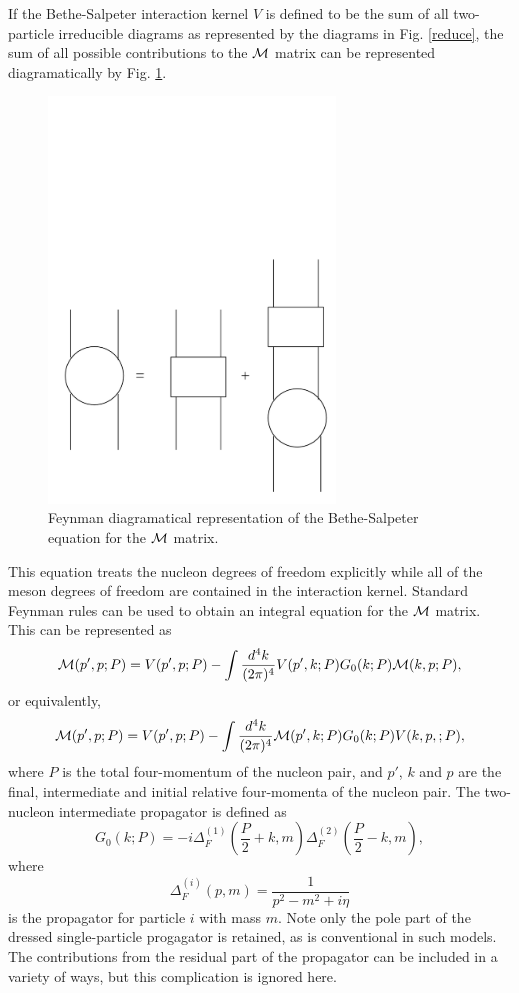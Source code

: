 \documentclass[mythesis.tex]{subfiles}
\begin{document}
If the Bethe-Salpeter interaction kernel $V$ is defined to be the sum of
all two-particle irreducible diagrams as represented by the diagrams in
Fig. \ref{reduce}, the sum of all possible contributions
to the $\cal M$ matrix can be represented diagramatically by Fig.
\ref{BStmatrix}.
%
\begin{figure}
\centerline{\includegraphics[width=3in]{graphics/new/bst.pdf}}
\caption{Feynman diagramatical representation of the
Bethe-Salpeter equation for the $\cal M$ matrix.}\label{BStmatrix}
\end{figure}
%
This equation treats the nucleon degrees of freedom explicitly while all of
the meson degrees of freedom are contained in the interaction kernel.
Standard Feynman rules can be used to obtain an integral equation for the
$\cal M$ matrix. This can be represented as
%
\begin{equation}
{\cal M}(p',p;P)=V(p',p;P)-\int\frac{d^4k}{(2\pi)^4} V(p',k;P) G_0(k;P)
{\cal M}(k,p;P),\label{BSt}
\end{equation}
%
or equivalently,
%
\begin{equation}
{\cal M}(p',p;P)=V(p',p;P)-\int\frac{d^4k}{(2\pi)^4} {\cal M}(p',k;P)
G_0(k;P) V(k,p,;P),\label{BStA}
\end{equation}
%
where $P$ is the total four-momentum of the nucleon pair, and $p'$, $k$ and
$p$
are the final, intermediate and initial relative four-momenta of the
nucleon pair. The two-nucleon intermediate propagator is defined as
%
\begin{equation}
G_0(k;P)=-i \Delta^{(1)}_F(\frac{P}{2}+k,m) \Delta^{(2)}_F(\frac{P}{2}-k,m),
\end{equation}
%
where
%
\begin{equation}
\Delta^{(i)}_F(p,m)=\frac{1}{p^2-m^2+i\eta}
\end{equation}
%
is the propagator for particle $i$ with mass $m$. Note only
the pole part of the  dressed single-particle progagator is retained, as is
conventional in such models. The contributions from the residual part of the
propagator can be included in a variety of ways, but this complication
is ignored here.
\end{document}
